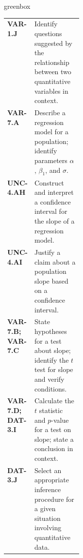 \documentclass[10pt]{article}
\begin{document}
\begin{skillbox}{greenbox}
\small
\begin{tabularx}{\linewidth}{@{} >{\bfseries}p{0.18\linewidth} X @{}}
  VAR-1.J   & Identify questions suggested by the relationship between two quantitative variables in context. \\
  VAR-7.A   & Describe a regression model for a population; identify parameters $\alpha$, $\beta_1$, and $\sigma$. \\
  UNC-4.AH  & Construct and interpret a confidence interval for the slope of a regression model. \\
  UNC-4.AI  & Justify a claim about a population slope based on a confidence interval. \\
  VAR-7.B; VAR-7.C  & State hypotheses for a test about slope; identify the $t$ test for slope and verify conditions. \\
  VAR-7.D; DAT-3.I  & Calculate the $t$ statistic and $p$-value for a test on slope; state a conclusion in context. \\
  DAT-3.J   & Select an appropriate inference procedure for a given situation involving quantitative data. \\
\end{tabularx}
\end{skillbox}
\end{document}
